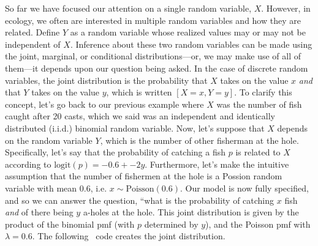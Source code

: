 So far we have focused our attention on a single random variable,
$X$. However, in ecology, we often are interested in multiple random
variables and how they are related. Define $Y$ as a random variable
whose realized values may or may not be independent of $X$. Inference
about these two random variables can be made using the joint,
marginal, or conditional distributions---or, we may make use of all of
them---it depends upon our question being asked. In the case of
discrete random variables, the joint
distribution is the probability that $X$ takes on the value $x$
\textit{and} that $Y$ takes on the value $y$, which is written
$[X=x,Y=y]$. To clarify this concept, let's go back to our previous
example where $X$ was the number of fish caught after 20 casts, which
we said was an independent and identically distributed (i.i.d.)
binomial random variable. Now,
let's suppose that $X$ depends on the random variable $Y$, which is
the number of other fisherman at the hole. Specifically, let's say
that the probability of catching a fish $p$ is related to $X$
according to $\text{logit}(p) = -0.6 + -2y$. Furthermore, let's
make the intuitive assumption that the number of fishermen at the hole
is a Possion random variable with mean $0.6$, i.e. $x \sim
\text{Poisson}(0.6)$. Our model is now fully specified, and so we can
answer the question, ``what is the probability of catching $x$ fish
\textit{and} of there being $y$ a-holes at the hole. This joint
distribution is given by the product of the binomial pmf (with $p$
determined by $y$), and the Poisson pmf with $\lambda=0.6$. The
following \R~code creates the joint distribution.
